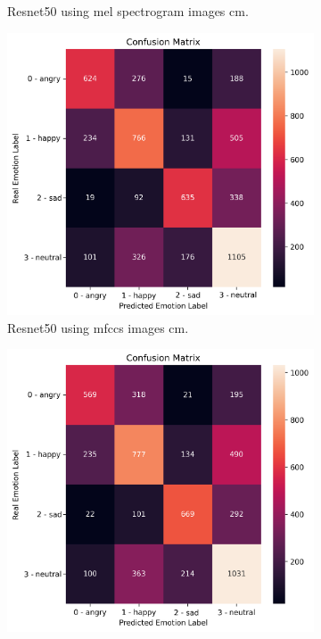 \begin{figure}[H]
\begin{subfigure}{.5\textwidth}
		\caption{Resnet50 using mel spectrogram images \ac{cm}.}
	\end{subfigure}
	\newline
	\begin{subfigure}{.5\textwidth}
		\centering
		\includegraphics[width=.9\linewidth]{figs/appendix/feature_selection/ResMFCC.png}
		\caption{Resnet50 using \ac{mfccs} images \ac{cm}.}
	\end{subfigure}%
	\begin{subfigure}{.5\textwidth}
		\centering
		\includegraphics[width=.9\linewidth]{figs/appendix/feature_selection/VGGMelSpec.png}

\end{subfigure}
\end{figure}
